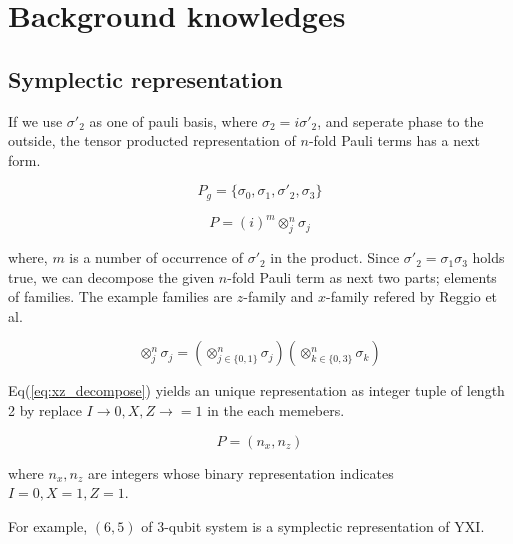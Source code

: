 \documentclass[twocolumn]{article}
\begin{document}
\section{Background knowledges}


\subsection{Symplectic representation}

If we use $\sigma'_2$ as one of pauli basis, where $\sigma_2 = i \sigma'_2$,
and seperate phase to the outside,
the tensor producted representation of $n$-fold Pauli terms has a next form.

\begin{equation}
    P_{g} = \{\sigma_0 , \sigma_1, \sigma'_2, \sigma_3\}
\end{equation}

\begin{equation}
    P = (i)^m \otimes_j^n \sigma_j
\end{equation}

where, $m$ is a number of occurrence of $\sigma'_2$ in the product.
Since $\sigma'_2 = \sigma_1 \sigma_3$ holds true, we can decompose the given $n$-fold Pauli term as next two
parts; elements of families. 
The example families are $z$-family and $x$-family refered by Reggio et al\cite{reggio_fast_2023}.

\begin{equation}
    \label{eq:xz_decompose}
    \otimes_j^n \sigma_j = \left( \otimes_{j \in \{0, 1\}}^n \sigma_j \right) \left( \otimes_{k \in \{0, 3\}}^n \sigma_k \right)
\end{equation}

Eq(\ref{eq:xz_decompose}) yields an unique representation as integer tuple of length 2 by 
replace $I \rightarrow 0, X, Z \rightarrow =1$ in the each memebers.

\begin{equation}
    P = (n_x, n_z)
\end{equation}

where $n_x, n_z$ are integers whose binary representation indicates $I=0, X=1, Z=1$.

For example, $(6, 5)$ of 3-qubit system is a symplectic representation of $\text{YXI}$.
\end{document}
